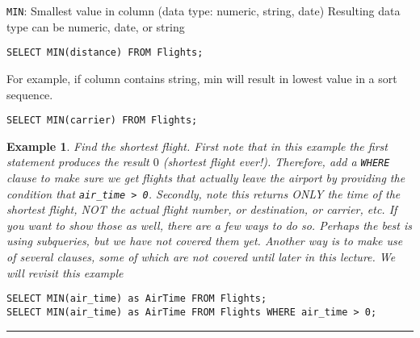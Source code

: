 \documentclass{article}
\newtheorem{example}{Example}
\begin{document}
\begin{outline}
 
    \1 \texttt{MIN}: Smallest value in column (data type: numeric, string, date)
        \2 Resulting data type can be numeric, date, or string
        
               
\begin{lstlisting}[frame=single]  
SELECT MIN(distance) FROM Flights;
\end{lstlisting} 
   
   
   
        \2 For example, if column contains string, min will result in lowest value in a sort sequence.  
        
\begin{lstlisting}[frame=single]  
SELECT MIN(carrier) FROM Flights;
\end{lstlisting} 
   
   
   
   
 

\end{outline}

\begin{example}
Find the shortest flight.  First note that in this example the first statement produces the result $0$ (shortest flight ever!).  Therefore, add a \texttt{WHERE} clause to make sure we get flights that actually leave the airport by providing the condition that \texttt{air\_time > 0}.  Secondly, note this returns ONLY the time of the shortest flight, NOT the actual flight number, or destination, or carrier, etc.  If you want to show those as well, there are a few ways to do so.  Perhaps the best is using subqueries, but we have not covered them yet.  Another way is to make use of several clauses, some of which are not covered until later in this lecture.  We will revisit this example
\end{example}  
      
\begin{lstlisting}[frame=single]  
SELECT MIN(air_time) as AirTime FROM Flights;
SELECT MIN(air_time) as AirTime FROM Flights WHERE air_time > 0;
\end{lstlisting} 
   
  

\hspace{-0.5cm}\rule[-0.101in]{\textwidth}{0.0025in}
    
  
  
  
  
\end{document}
